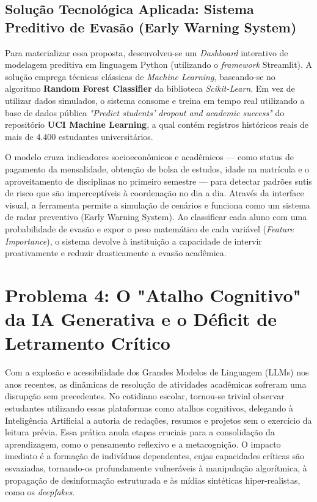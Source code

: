 \subsection*{Solução Tecnológica Aplicada: Sistema Preditivo de Evasão (Early Warning System)}

Para materializar essa proposta, desenvolveu-se um \textit{Dashboard} interativo de modelagem preditiva em linguagem Python (utilizando o \textit{framework} Streamlit). A solução emprega técnicas clássicas de \textit{Machine Learning}, baseando-se no algoritmo \textbf{Random Forest Classifier} da biblioteca \textit{Scikit-Learn}. Em vez de utilizar dados simulados, o sistema consome e treina em tempo real utilizando a base de dados pública \textit{"Predict students' dropout and academic success"} do repositório \textbf{UCI Machine Learning}, a qual contém registros históricos reais de mais de 4.400 estudantes universitários.

O modelo cruza indicadores socioeconômicos e acadêmicos — como status de pagamento da mensalidade, obtenção de bolsa de estudos, idade na matrícula e o aproveitamento de disciplinas no primeiro semestre — para detectar padrões sutis de risco que são imperceptíveis à coordenação no dia a dia. Através da interface visual, a ferramenta permite a simulação de cenários e funciona como um sistema de radar preventivo (Early Warning System). Ao classificar cada aluno com uma probabilidade de evasão e expor o peso matemático de cada variável (\textit{Feature Importance}), o sistema devolve à instituição a capacidade de intervir proativamente e reduzir drasticamente a evasão acadêmica.


\section*{Problema 4: O "Atalho Cognitivo" da IA Generativa e o Déficit de Letramento Crítico}

Com a explosão e acessibilidade dos Grandes Modelos de Linguagem (LLMs) nos anos recentes, as dinâmicas de resolução de atividades acadêmicas sofreram uma disrupção sem precedentes. No cotidiano escolar, tornou-se trivial observar estudantes utilizando essas plataformas como atalhos cognitivos, delegando à Inteligência Artificial a autoria de redações, resumos e projetos sem o exercício da leitura prévia. Essa prática anula etapas cruciais para a consolidação da aprendizagem, como o pensamento reflexivo e a metacognição. O impacto imediato é a formação de indivíduos dependentes, cujas capacidades críticas são esvaziadas, tornando-os profundamente vulneráveis à manipulação algorítmica, à propagação de desinformação estruturada e às mídias sintéticas hiper-realistas, como os \textit{deepfakes}.

